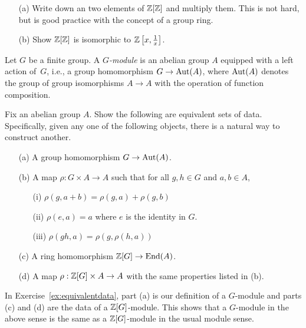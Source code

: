 \begin{exercise}
	\hfill
	\begin{enumerate}
		\item[(a)]
			Write down an two elements of $\mathbb{Z}[\mathbb{Z}]$ and multiply them.
			This is not hard, but is good practice with the concept
			of a group ring.
		\item[(b)]
			Show $\mathbb{Z}[\mathbb{Z}]$ is isomorphic to $\mathbb{Z}\left[x,\frac{1}{x}\right]$.
	\end{enumerate}
\end{exercise}

\begin{definition}
	Let $G$ be a finite group. A \emph{$G$-module} is
	an abelian group $A$ equipped with a left action of~$G$,
	i.e., a group homomorphism $G\to\operatorname{Aut}(A)$, where $\operatorname{Aut}(A)$
	denotes the group of group isomorphisms $A\to A$ with
	the operation of function composition.
\end{definition}

\begin{exercise}\label{ex:equivalentdata}
	Fix an abelian group $A$.
	Show the following are equivalent sets of data.
	Specifically, given any one of the following objects,
	there is a natural way to construct another.
	\begin{enumerate}
		\item[(a)] A group homomorphism $G\to \operatorname{Aut}(A)$.
		\item[(b)] A map $\rho:G\times A \to A$ such that
			for all $g,h\in G$ and $a,b\in A$,
			\begin{enumerate}
				\item[(i)]
					$\rho(g,a+b) = \rho(g,a) + \rho(g,b)$
				\item[(ii)]
					$\rho(e,a) = a$ where $e$ is the identity in $G$.
				\item[(iii)]
					$\rho(gh,a) = \rho(g,\rho(h,a))$
			\end{enumerate}
		\item[(c)] A ring homomorphism $\mathbb{Z}[G] \to \operatorname{End}(A)$.
		\item[(d)] A map $\rho:\mathbb{Z}[G]\times A \to A$ with
			the same properties listed in (b).
	\end{enumerate}
\end{exercise}

\begin{remark}
	In Exercise~\ref{ex:equivalentdata}, part (a) is our definition
	of a $G$-module and parts (c) and (d) are
	the data of a $\mathbb{Z}[G]$-module. This shows that a $G$-module
	in the above sense is the same as a $\mathbb{Z}[G]$-module
	in the usual module sense.
\end{remark}

